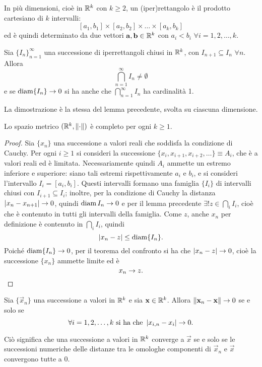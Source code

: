 In più dimensioni, cioè in $\mathbb{R}^k$ con $k\geq 2$, un (iper)rettangolo è il prodotto cartesiano di $k$ intervalli:
\[
[a_1,b_1]\times[a_2,b_2]\times\dots\times[a_k,b_k]
\]
ed è quindi determinato da due vettori $\mathbf{a},\mathbf{b}\in\mathbb{R}^k$ con $a_i<b_i$ $\forall i=1,2,\dots,k$.
\begin{lemma}
Sia $\{I_n\}_{n=1}^{\infty}$ una successione di iperrettangoli chiusi in $\mathbb{R}^k$, con $I_{n+1}\subseteq I_n$ $\forall n$. Allora
\[
\bigcap_{n=1}^{\infty} I_n\neq\emptyset
\]
e se $\operatorname{diam}\{I_n\}\to 0$ si ha anche che $\bigcap_{n=1}^{\infty} I_n$ ha cardinalità 1.
\end{lemma}
La dimostrazione è la stessa del lemma precedente, svolta su ciascuna dimensione.
\begin{teorema}
\label{t:completo}
Lo spazio metrico $(\mathbb{R}^k,\left\|{\cdot}\right\|)$ è completo per ogni $k\geq 1$.
\end{teorema}
\begin{proof}
Sia $\{x_n\}$ una successione a valori reali che soddisfa la condizione di Cauchy. Per ogni $i\geq 1$ si consideri la successione $\{x_i,x_{i+1},x_{i+2},\dots\}\equiv A_i$, che è a valori reali ed è limitata. Necessariamente quindi $A_i$ ammette un estremo inferiore e superiore: siano tali estremi rispettivamente $a_i$ e $b_i$, e si consideri l'intervallo $I_i=[a_i,b_i]$.
Questi intervalli formano una famiglia $\{I_i\}$ di intervalli chiusi con $I_{i+1}\subseteq I_i$; inoltre, per la condizione di Cauchy la distanza $\left|{x_n-x_{n+1}}\right|\to 0$, quindi $\operatorname{diam} I_n\to 0$ e per il lemma precedente $\exists! z\in\bigcap\nolimits _i I_i$, cioè che è contenuto in tutti gli intervalli della famiglia. Come $z$, anche $x_n$ per definizione è contenuto in $\bigcap\nolimits _i I_i$, quindi
\[
\left|{x_n-z}\right|\leq\operatorname{diam}\{I_n\}.
\]
Poiché $\operatorname{diam}\{I_n\}\to 0$, per il teorema del confronto si ha che $\left|{x_n-z}\right|\to 0$, cioè la successione $\{x_n\}$ ammette limite ed è
\[
x_n\to z.\qedhere
\]
\end{proof}
\begin{teorema}
Sia $\{\vec x_n\}$ una successione a valori in $\mathbb{R}^k$ e sia $\mathbf{x}\in\mathbb{R}^k$. Allora $\left\|{\mathbf{x}_n-\mathbf{x}}\right\|\to 0$ se e solo se
\[
\forall i=1,2,\dots,k\text{ si ha che }\left|{x_{i,n}-x_i}\right|\to 0.
\]
\end{teorema}
Ciò significa che una successione a valori in $\mathbb{R}^k$ converge a $\vec x$ se e solo se le successioni numeriche delle distanze tra le omologhe componenti di $\vec x_n$ e $\vec x$ convergono tutte a 0.

